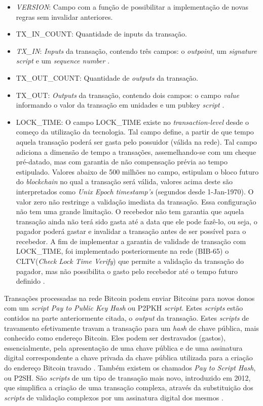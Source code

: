 \documentclass[
	article,			%
	11pt,				%
	oneside,			%
	a4paper,			%
	chapter=TITLE,		%
	section=TITLE,		%
	subsection=TITLE,	%
	subsubsection=TITLE, %
	english,			%
	brazil,				%
	sumario=tradicional
	]{ifrs-artigo-abntex2}
\begin{document}
\begin{itemize}
	\item \textit{VERSION}: Campo com a função de possibilitar a implementação de novas regras sem invalidar anteriores.
	\item TX\_IN\_COUNT: Quantidade de inputs da transação.
	\item \textit{TX\_IN}: \textit{Inputs} da transação, contendo três campos: o \textit{outpoint}, um \textit{signature script} e um \textit{sequence number} \cite{bitcoinGloss}.
	\item TX\_OUT\_COUNT: Quantidade de \textit{outputs} da transação.
	\item TX\_OUT: \textit{Outputs} da transação, contendo dois campos: o campo \textit{value} informando o valor da transação em unidades e um pubkey \textit{script} \cite{bitcoinGloss}.
	\item LOCK\_TIME: O campo LOCK\_TIME existe no \textit{transaction-level} desde o começo da utilização da tecnologia. Tal campo define, a partir de que tempo aquela transação poderá ser gasta pelo possuidor (válida na rede). Tal campo adiciona a dimensão de tempo a transações, assemelhando-se com um cheque pré-datado, mas com garantia de não compensação prévia ao tempo estipulado.
Valores abaixo de 500 milhões no campo, estipulam o bloco futuro do \textit{blockchain} no qual a transação será válida, valores acima deste são interpretados como \textit{Unix Epoch timestamp’s} (segundos desde 1-Jan-1970). O valor zero não restringe a validação imediata da transação. Essa configuração não tem uma grande limitação. O recebedor não tem garantia que aquela transação ainda não terá sido gasta até a data que ele pode fazê-lo, ou seja, o pagador poderá gastar e invalidar a transação antes de ser possível para o recebedor. A fim de implementar a garantia de validade de transação com LOCK\_TIME, foi implementado posteriormente na rede (BIB-65) o CLTV(\textit{Check Lock Time Verify}) que permite a validação da transação do pagador, mas não possibilita o gasto pelo recebedor até o tempo futuro definido \cite{masterBit}.
\end{itemize}

Transações processadas na rede Bitcoin podem enviar Bitcoins para novos donos com um \textit{script Pay to Public Key Hash} ou P2PKH \textit{script}. Estes \textit{scripts} estão contidos na parte anteriormente citada, o \textit{output} da transação. Estes \textit{scripts} de travamento efetivamente travam a transação para um \textit{hash} de chave pública, mais conhecido como endereço Bitcoin. Eles podem ser destravados (gastos), essencialmente, pela apresentação de uma chave pública e de uma assinatura digital correspondente a chave privada da chave pública utilizada para a criação do endereço Bitcoin travado \cite{masterBit}.
Também existem os chamados \textit{Pay to Script Hash}, ou P2SH. São \textit{scripts} de um tipo de transação mais novo, introduzido em 2012, que simplifica a criação de uma transação complexa, através da substituição dos \textit{scripts} de validação complexos por um assinatura digital dos mesmos \cite{masterBit}.
\end{document}
